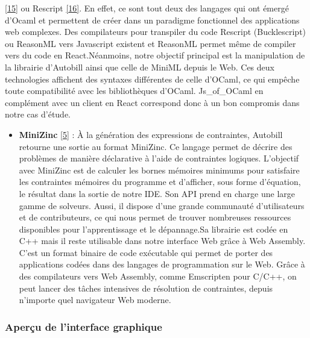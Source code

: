 \documentclass[12pt]{article}
\begin{document}
\begin{itemize}
        \protect\hyperlink{ref-reasonml}{{[}15{]}} ou Rescript
        \protect\hyperlink{ref-rescript}{{[}16{]}}. En effet, ce sont tout
        deux des langages qui ont émergé d'Ocaml et permettent de créer dans
        un paradigme fonctionnel des applications web complexes. Des
        compilateurs pour transpiler du code Rescript (Bucklescript) ou
        ReasonML vers Javascript existent et ReasonML permet même de compiler
        vers du code en React.\newline  Néanmoins, notre objectif principal
        est la manipulation de la librairie d'Autobill ainsi que celle de
        MiniML depuis le Web. Ces deux technologies affichent des syntaxes
        différentes de celle d'OCaml, ce qui empêche toute compatibilité avec
        les bibliothèques d'OCaml. Js\_of\_OCaml en complément avec un client
        en React correspond donc à un bon compromis dans notre cas d'étude.
\end{itemize}

\newpage

\begin{itemize}
  \tightlist
  \item
        \textbf{MiniZinc} \protect\hyperlink{ref-minizinc}{{[}5{]}} : À la
        génération des expressions de contraintes, Autobill retourne une
        sortie au format MiniZinc. Ce langage permet de décrire des problèmes
        de manière déclarative à l'aide de contraintes logiques. L'objectif
        avec MiniZinc est de calculer les bornes mémoires minimums pour
        satisfaire les contraintes mémoires du programme et d'afficher, sous
        forme d'équation, le résultat dans la sortie de notre IDE. Son API
        prend en charge une large gamme de solveurs. Aussi, il dispose d'une
        grande communauté d'utilisateurs et de contributeurs, ce qui nous
        permet de trouver nombreuses ressources disponibles pour
        l'apprentissage et le dépannage.\newline  Sa librairie est codée en
        C++ mais il reste utilisable dans notre interface Web grâce à Web
        Assembly. C'est un format binaire de code exécutable qui permet de
        porter des applications codées dans des langages de programmation sur
        le Web. Grâce à des compilateurs vers Web Assembly, comme Emscripten
        pour C/C++, on peut lancer des tâches intensives de résolution de
        contraintes, depuis n'importe quel navigateur Web moderne.
\end{itemize}

\hypertarget{aperuxe7u-de-linterface-graphique}{%
  \subsubsection{Aperçu de l'interface
    graphique}\label{aperuxe7u-de-linterface-graphique}}
\end{document}
